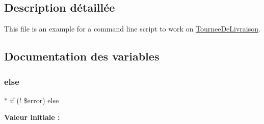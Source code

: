 \subsection{Description détaillée}
This file is an example for a command line script to work on \hyperlink{classTourneeDeLivraison}{Tournee\+De\+Livraison}. 



\subsection{Documentation des variables}
\mbox{\label{scripts_2tourneedelivraison_8php_a7b6906d90f668055f3c8e8b2ae497513}} 
\subsubsection{\texorpdfstring{else}{else}}
{\footnotesize\ttfamily $\ast$ if (! \$error) else}

{\bfseries Valeur initiale \+:}
